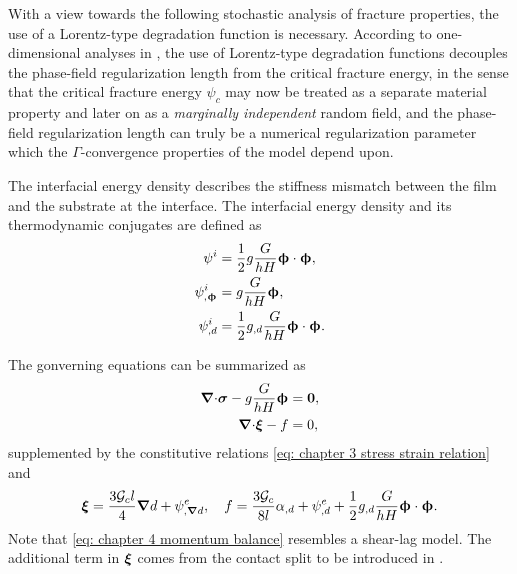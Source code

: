 \begin{remark}
  With a view towards the following stochastic analysis of fracture properties, the use of a Lorentz-type degradation function is necessary. According to one-dimensional analyses in \cite{geelen2019phase,wu2017unified}, the use of Lorentz-type degradation functions decouples the phase-field regularization length from the critical fracture energy, in the sense that the critical fracture energy $\psi_c$ may now be treated as a separate material property and later on as a \emph{marginally independent} random field, and the phase-field regularization length can truly be a numerical regularization parameter which the $\Gamma$-convergence properties of the model depend upon.
\end{remark}

The interfacial energy density describes the stiffness mismatch between the film and the substrate at the interface. The interfacial energy density and its thermodynamic conjugates are defined as
\begin{subequations}
  \begin{align}
    \psi^i                & = \dfrac{1}{2}g\dfrac{G}{hH}\boldsymbol{\upphi}\cdot\boldsymbol{\upphi},      \\
    \psi^i_{,\boldsymbol{\upphi}} & = g\dfrac{G}{hH}\boldsymbol{\upphi},                                  \\
    \psi^i_{,d}           & = \dfrac{1}{2}g_{,d}\dfrac{G}{hH}\boldsymbol{\upphi}\cdot\boldsymbol{\upphi}. 
  \end{align}
\end{subequations}

The gonverning equations can be summarized as
\begin{align}
  {\boldsymbol{\nabla}\cdot} \boldsymbol{\sigma} - g\dfrac{G}{hH}\boldsymbol{\upphi} & = \boldsymbol{0}, \label{eq: chapter 4 momentum balance} \\
  {\boldsymbol{\nabla} \cdot} \boldsymbol{\xi} - f                        & = 0,                                             
\end{align}
supplemented by the constitutive relations \eqref{eq: chapter 3 stress strain relation} and
\begin{align}
  \boldsymbol{\xi} = \dfrac{3{\mathcal{G}_c} l}{4} \boldsymbol{\nabla} d + \psi^e_{,\boldsymbol{\nabla} d}, \quad f = \dfrac{3{\mathcal{G}_c}}{8l}\alpha_{,d} + \psi^e_{,d} + \dfrac{1}{2}g_{,d}\dfrac{G}{hH}\boldsymbol{\upphi}\cdot\boldsymbol{\upphi}.
\end{align}
Note that \eqref{eq: chapter 4 momentum balance} resembles a shear-lag model. The additional term in $\boldsymbol{\xi}$ comes from the contact split to be introduced in .

